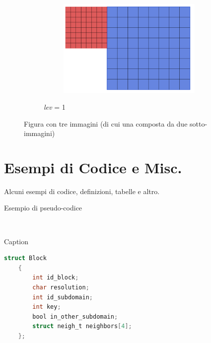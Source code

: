 \begin{figure}[H]
\begin{subfigure}{0.7\textwidth}
\begin{subfigure}{0.5\textwidth}
			\includegraphics[width=0.5\linewidth]{immagini/bloccomaggiore2.png}
		\end{subfigure}
		\caption{\textit{lev} = 1}
		\label{fig:lev1}
	\end{subfigure}
	\caption{Figura con tre immagini (di cui una composta da due sotto-immagini)}
	\label{fig:three}
\end{figure}

\section{Esempi di Codice e Misc.}\label{sec:code}
Alcuni esempi di codice, definizioni, tabelle e altro.

\begin{algorithm}[ht]
	\caption{Esempio di pseudo-codice}
	\label{alg:Prim_Mst}
	\begin{algorithmic}[1]
		\Statex
		\\
		\EndFor
		\EndIf
		\EndFor
		\EndWhile
		\State \Return{}
		\EndFunction
	\end{algorithmic}
\end{algorithm}

\begin{algorithm}[]
	\caption{Caption}
    \label{lst:kintegersetinizio}
    \begin{lstlisting}[style=custom, language=C]
	struct Block
	{
		int id_block;
		char resolution;
		int id_subdomain;
		int key;
		bool in_other_subdomain;
		struct neigh_t neighbors[4];
	};
\end{lstlisting}
\end{algorithm}



